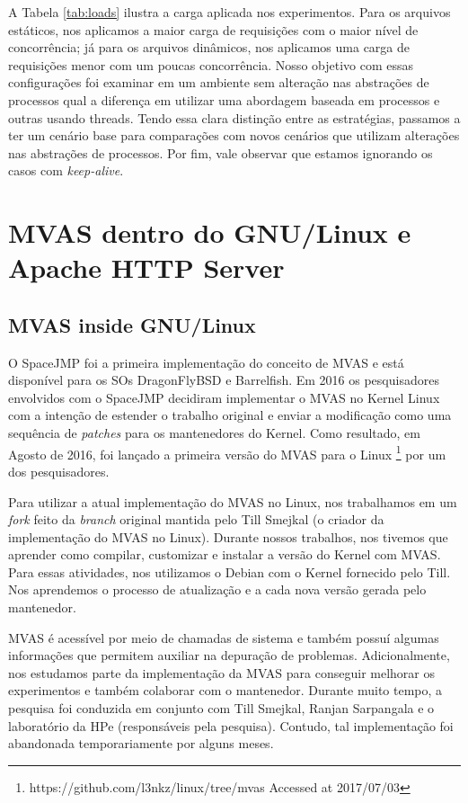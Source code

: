 A Tabela \ref{tab:loads} ilustra a carga aplicada nos experimentos. Para os
arquivos estáticos, nos aplicamos a maior carga de requisições com o maior
nível de concorrência; já para os arquivos dinâmicos, nos aplicamos uma carga
de requisições menor com um poucas concorrência. Nosso objetivo com essas
configurações foi examinar em um ambiente sem alteração nas abstrações de
processos qual a diferença em utilizar uma abordagem baseada em processos e
outras usando threads. Tendo essa clara distinção entre as estratégias,
passamos a ter um cenário base para comparações com novos cenários que utilizam
alterações nas abstrações de processos. Por fim, vale observar que estamos
ignorando os casos com \emph{keep-alive}.

\section{MVAS dentro do GNU/Linux e Apache HTTP Server}
\label{sec:mvas_inside_httpd}

\subsection{MVAS inside GNU/Linux}

O SpaceJMP \citep{spacejmp} foi a primeira implementação do conceito de MVAS e
está disponível para os SOs DragonFlyBSD e Barrelfish. Em 2016 os pesquisadores
envolvidos com o SpaceJMP decidiram implementar o MVAS no Kernel Linux com a
intenção de estender o trabalho original e enviar a modificação como uma
sequência de \emph{patches} para os mantenedores do Kernel. Como resultado, em
Agosto de 2016, foi lançado a primeira versão do MVAS para o Linux
\footnote{https://github.com/l3nkz/linux/tree/mvas Accessed at 2017/07/03} por
um dos pesquisadores.
 
Para utilizar a atual implementação do MVAS no Linux, nos trabalhamos em um
\emph{fork} feito da \emph{branch} original mantida pelo Till Smejkal (o
criador da implementação do MVAS no Linux). Durante nossos trabalhos, nos
tivemos que aprender como compilar, customizar e instalar a versão do Kernel
com MVAS. Para essas atividades, nos utilizamos o Debian com o Kernel fornecido
pelo Till. Nos aprendemos o processo de atualização e a cada nova versão gerada
pelo mantenedor.

MVAS é acessível por meio de chamadas de sistema e também possuí algumas
informações que permitem auxiliar na depuração de problemas. Adicionalmente,
nos estudamos parte da implementação da MVAS para conseguir melhorar os
experimentos e também colaborar com o mantenedor. Durante muito tempo, a
pesquisa foi conduzida em conjunto com Till Smejkal, Ranjan Sarpangala e o
laboratório da HPe (responsáveis pela pesquisa). Contudo, tal implementação foi
abandonada temporariamente por alguns meses.
 
